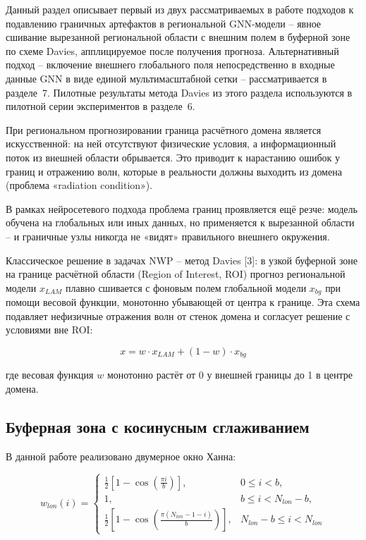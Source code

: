 \documentclass[14pt,a4paper]{extarticle}
\numberwithin{table}{section}
\numberwithin{figure}{section}
\numberwithin{equation}{section}
\begin{document}
Данный раздел описывает первый из двух рассматриваемых в работе
подходов к подавлению граничных артефактов в региональной GNN-модели
-- явное сшивание вырезанной региональной области с внешним полем в
буферной зоне по схеме Davies, апплицируемое после получения
прогноза. Альтернативный подход -- включение внешнего глобального
поля непосредственно в входные данные GNN в виде единой
мультимасштабной сетки -- рассматривается в разделе~7. Пилотные
результаты метода Davies из этого раздела используются в пилотной серии
экспериментов в разделе~6.

При региональном прогнозировании граница расчётного домена является
искусственной: на ней отсутствуют физические условия, а
информационный поток из внешней области обрывается. Это приводит к
нарастанию ошибок у границ и отражению волн, которые в реальности должны
выходить из домена (проблема «radiation condition»).

В рамках нейросетевого подхода проблема границ проявляется ещё резче:
модель обучена на глобальных или иных данных, но применяется к
вырезанной области -- и граничные узлы никогда не «видят» правильного
внешнего окружения.

Классическое решение в задачах NWP -- метод Davies {[}3{]}:
в узкой буферной зоне на границе расчётной области (Region of Interest, ROI) прогноз региональной модели
\(x_{LAM}\) плавно сшивается с фоновым полем глобальной модели
\(x_{bg}\) при помощи весовой функции, монотонно убывающей от центра
к границе. Эта схема подавляет нефизичные отражения волн от стенок
домена и согласует решение с условиями вне ROI:

\[x = w \cdot x_{LAM} + (1 - w) \cdot x_{bg}\]

где весовая функция \(w\) монотонно растёт от 0 у внешней границы до 1 в
центре домена.

\subsection{Буферная зона с косинусным сглаживанием}\label{ux431ux443ux444ux435ux440ux43dux430ux44f-ux437ux43eux43dux430-ux441-ux43aux43eux441ux438ux43dux443ux441ux43dux44bux43c-ux441ux433ux43bux430ux436ux438ux432ux430ux43dux438ux435ux43c}

В данной работе реализовано двумерное окно Ханна:

\[w_{lon}(i) = \begin{cases} \frac{1}{2}\left[1 - \cos\!\left(\frac{\pi i}{b}\right)\right], & 0 \le i < b, \\ 1, & b \le i < N_{lon} - b, \\ \frac{1}{2}\left[1 - \cos\!\left(\frac{\pi (N_{lon}-1-i)}{b}\right)\right], & N_{lon} - b \le i < N_{lon} \end{cases}\]
\end{document}

